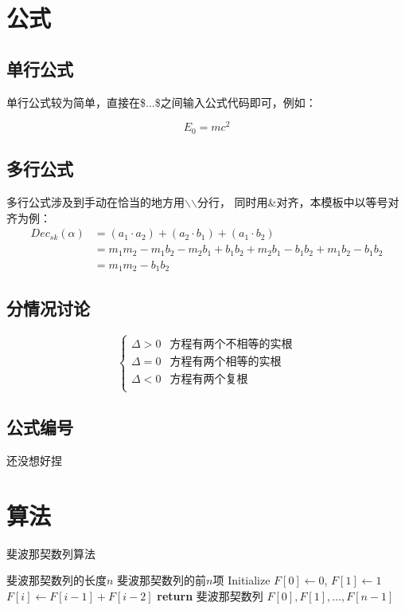 \documentclass[12pt, a4paper, oneside]{ctexart}
\begin{document}
\newpage

\section{公式}


\subsection{单行公式}
单行公式较为简单，直接在\$...\$之间输入公式代码即可，例如：\par
\begin{equation}
    E_0=mc^2
\end{equation}

\subsection{多行公式}
多行公式涉及到手动在恰当的地方用$\backslash$$\backslash$分行，
同时用\&对齐，本模板中以等号对齐为例：\\
\begin{equation}
    \begin{split}
        Dec_{sk}(\alpha)&=(a_1\cdot a_2)+(a_2\cdot b_1)+(a_1\cdot b_2)\\
        &= m_1m_2-m_1b_2-m_2b_1+b_1b_2+m_2b_1-b_1b_2+m_1b_2-b_1b_2\\
        &= m_1m_2-b_1b_2
    \end{split}
\end{equation}
\subsection{分情况讨论}

$$
    \begin{cases}
        \Delta >0 & \text{方程有两个不相等的实根} \\
        \Delta =0 & \text{方程有两个相等的实根}  \\
        \Delta <0 & \text{方程有两个复根}     \\
    \end{cases}
$$
\subsection{公式编号}
还没想好捏

\section{算法}

\begin{algorithm}
    \renewcommand{\algorithmicrequire}{\textbf{Input:}}
    \renewcommand{\algorithmicensure}{\textbf{Output:}}
    \caption{斐波那契数列算法}
    \label{alg:fibonacci}
    \begin{algorithmic}[1]
        \REQUIRE  斐波那契数列的长度$n$
        \ENSURE 斐波那契数列的前$n$项
        \STATE Initialize $F[0] \gets 0$, $F[1] \gets 1$
        \STATE $F[i] \gets F[i-1] + F[i-2]$
        \ENDFOR
        \STATE \textbf{return} 斐波那契数列 $F[0], F[1], \ldots, F[n-1]$
    \end{algorithmic}
\end{algorithm}
\end{document}
